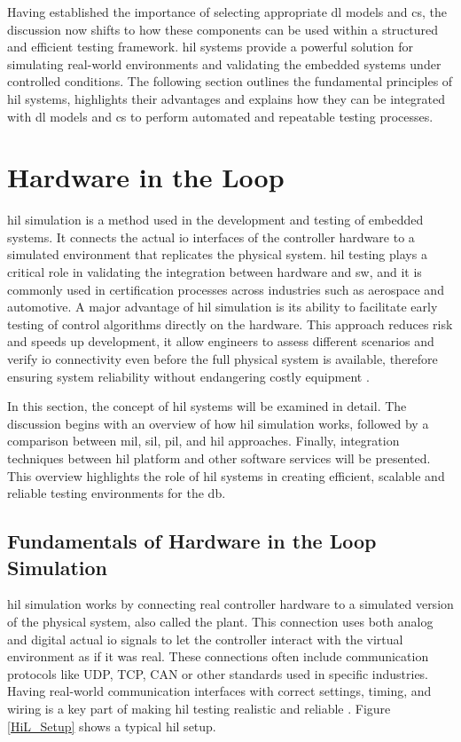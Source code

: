 Having established the importance of selecting appropriate \gls{dl} models and \gls{cs}, the discussion now shifts to how these components can be used within a structured and efficient testing framework. \gls{hil} systems provide a powerful solution for simulating real-world environments and validating the embedded systems under controlled conditions. The following section outlines the fundamental principles of \gls{hil} systems, highlights their advantages and explains how they can be integrated with \gls{dl} models and \gls{cs} to perform automated and repeatable testing processes.

\section{Hardware in the Loop}
\gls{hil} simulation is a method used in the development and testing of embedded systems. It connects the actual \gls{io} interfaces of the controller hardware to a simulated environment that replicates the physical system. \gls{hil} testing plays a critical role in validating the integration between hardware and \gls{sw}, and it is commonly used in certification processes across industries such as aerospace and automotive. A major advantage of \gls{hil} simulation is its ability to facilitate early testing of control algorithms directly on the hardware. This approach reduces risk and speeds up development, it allow engineers to assess different scenarios and verify \gls{io} connectivity even before the full physical system is available, therefore ensuring system reliability without endangering costly equipment \cite{HiL_Testing}.

In this section, the concept of \gls{hil} systems will be examined in detail. The discussion begins with an overview of how \gls{hil} simulation works, followed by a comparison between \gls{mil}, \gls{sil}, \gls{pil}, and \gls{hil} approaches. Finally, integration techniques between \gls{hil} platform and other software services will be presented. This overview highlights the role of \gls{hil} systems in creating efficient, scalable and reliable testing environments for the \gls{db}.

\subsection{Fundamentals of Hardware in the Loop Simulation}
\gls{hil} simulation works by connecting real controller hardware to a simulated version of the physical system, also called the plant. This connection uses both analog and digital actual \gls{io} signals to let the controller interact with the virtual environment as if it was real. These connections often include communication protocols like UDP, TCP, CAN or other standards used in specific industries. Having real-world communication interfaces with correct settings, timing, and wiring is a key part of making \gls{hil} testing realistic and reliable \cite{HiL_Testing}. Figure \ref{HiL_Setup} shows a typical \gls{hil} setup.

